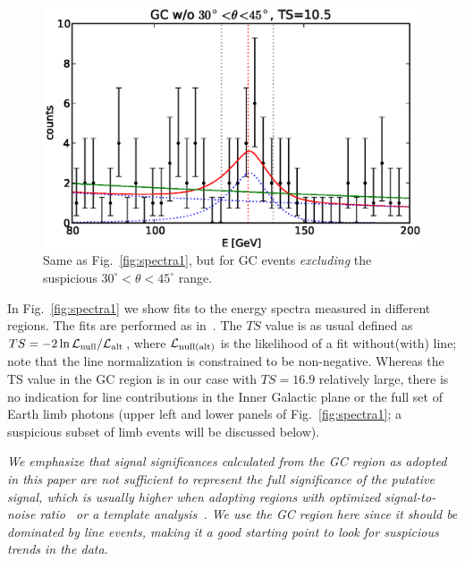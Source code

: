 \documentclass[aps,twocolumn,prd,superscriptaddress,showpacs,nofootinbib,fixfloat]{revtex4}
\begin{document}
\begin{figure}
  \centering
  \includegraphics[width=1.\linewidth]{plots/counts_GC_wo3045.eps}
  \caption{Same as Fig.~\ref{fig:spectra1}, but for GC events \emph{excluding}
  the suspicious $30^\circ<\theta<45^\circ$ range.}
  \label{fig:spectra2}
\end{figure}

In Fig.~\ref{fig:spectra1} we show fits to the energy spectra measured in
different regions. The fits are performed as in~\cite{Weniger:2012}. The $TS$
value is as usual defined as $TS=-2\ln \mathcal{L}_{\rm null}/\mathcal{L}_{\rm
alt}$, where $\mathcal{L}_{\rm null(alt)}$ is the likelihood of a fit
without(with) line; note that the line normalization is constrained to be
non-negative. Whereas the TS value in the GC region is in our case with
$TS=16.9$ relatively large, there is no indication for line contributions in
the Inner Galactic plane or the full set of Earth limb photons (upper left and
lower panels of Fig.~\ref{fig:spectra1}; a suspicious subset of limb events
will be discussed below).

\emph{We emphasize that signal significances calculated from the GC region as
adopted in this paper are not sufficient to represent the full significance of
the putative signal, which is usually higher when adopting regions with
optimized signal-to-noise ratio~\cite{Weniger:2012} or a template
analysis~\cite{linepaper}. We use the GC region here since it should be
dominated by line events, making it a good starting point to look for
suspicious trends in the data.}


\end{document}
